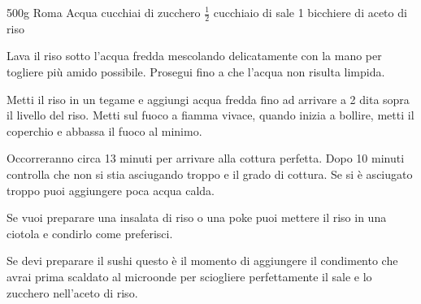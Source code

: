 \begin{ingreds}
	500g  Roma
	Acqua
\columnbreak
{} cucchiai di zucchero
	$\frac{1}{2}$ cucchiaio di sale
	1 bicchiere di aceto di riso
\end{ingreds}

\begin{method}
Lava il riso sotto l'acqua fredda mescolando delicatamente con la mano per togliere più amido possibile. Prosegui fino a che l'acqua non risulta limpida.

Metti il riso in un tegame e aggiungi acqua fredda fino ad arrivare a 2 dita sopra il livello del riso. Metti sul fuoco a fiamma vivace, quando inizia a bollire, metti il coperchio e abbassa il fuoco al minimo.

Occorreranno circa 13 minuti per arrivare alla cottura perfetta. Dopo 10 minuti controlla che non si stia asciugando troppo e il grado di cottura. Se si è asciugato troppo puoi aggiungere poca acqua calda.

Se vuoi preparare una insalata di riso o una poke puoi mettere il riso in una ciotola e condirlo come preferisci.

Se devi preparare il sushi questo è il momento di aggiungere il condimento che avrai prima scaldato al microonde per sciogliere perfettamente il sale e lo zucchero nell'aceto di riso.

\end{method}



